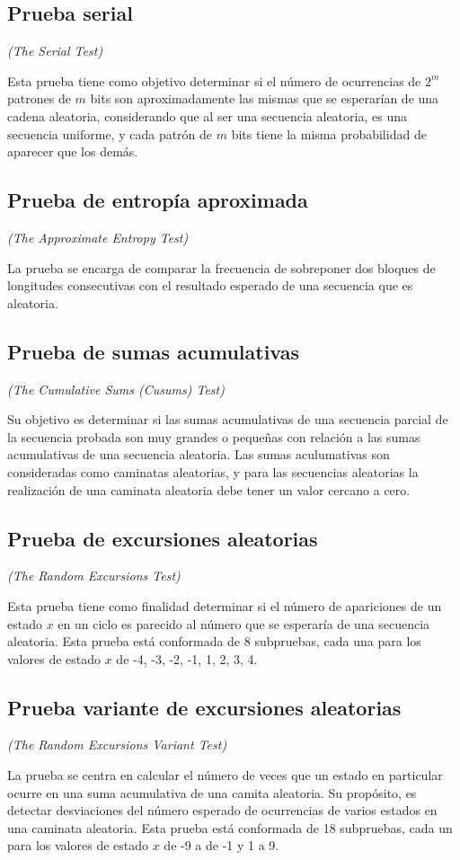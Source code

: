 \subsection{Prueba serial} %
\textit{(The Serial Test)}

Esta prueba tiene como objetivo determinar si el número de ocurrencias de
$2^m$ patrones de $m$ bits son aproximadamente las mismas que se esperarían
de una cadena aleatoria, considerando que al ser una secuencia aleatoria,
es una secuencia uniforme, y cada patrón de $m$ bits tiene la misma
probabilidad de aparecer que los demás.

\subsection{Prueba de entropía aproximada} %
\textit{(The Approximate Entropy Test)}

La prueba se encarga de comparar la frecuencia de sobreponer dos bloques de
longitudes consecutivas con el resultado esperado de una secuencia que es
aleatoria.

\subsection{Prueba de sumas acumulativas} %
\textit{(The Cumulative Sums (Cusums) Test)}

Su objetivo es determinar si las sumas acumulativas de una secuencia parcial
de la secuencia probada son muy grandes o pequeñas con relación a las sumas
acumulativas de una secuencia aleatoria. Las sumas aculumativas son
consideradas como caminatas aleatorias, y para las secuencias aleatorias
la realización de una caminata aleatoria debe tener un valor cercano a cero.

\subsection{Prueba de excursiones aleatorias} %
\textit{(The Random Excursions Test)}

Esta prueba tiene como finalidad determinar si el número de apariciones de un
estado $x$ en un ciclo es parecido al número que se esperaría de una secuencia
aleatoria. Esta prueba está conformada de 8 subpruebas, cada una para los
valores de estado $x$ de -4, -3, -2, -1, 1, 2, 3, 4.

\subsection{Prueba variante de excursiones aleatorias} %
\textit{(The Random Excursions Variant Test)}

La prueba se centra en calcular el número de veces que un estado en particular
ocurre en una suma acumulativa de una camita aleatoria. Su propósito, es
detectar desviaciones del número esperado de ocurrencias de varios estados
en una caminata aleatoria. Esta prueba está conformada de 18 subpruebas, cada
un para los valores de estado $x$ de -9 a de -1 y  1 a 9.

